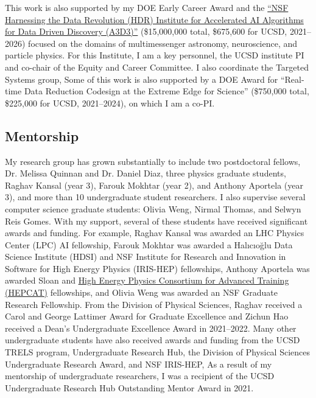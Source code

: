 \documentclass[11pt,letterpaper,notitlepage]{article}
\begin{document}
This work is also supported by my DOE Early Career Award and the \href{https://a3d3.ai}{``NSF Harnessing the Data Revolution (HDR) Institute for Accelerated AI Algorithms for Data Driven Discovery (A3D3)''} (\$15,000,000 total, \$675,600 for UCSD, 2021--2026) focused on the domains of multimessenger astronomy, neuroscience, and particle physics.
For this Institute, I am a key personnel, the UCSD institute PI and co-chair of the Equity and Career Committee.
I also coordinate the Targeted Systems group,
Some of this work is also supported by a DOE Award for ``Real-time Data Reduction Codesign at the Extreme Edge for Science'' (\$750,000 total, \$225,000 for UCSD, 2021--2024), on which I am a co-PI.
\vspace{-1ex}
\subsection*{Mentorship}

My research group has grown substantially to include two postdoctoral fellows, Dr. Melissa Quinnan and Dr. Daniel Diaz, three physics graduate students, Raghav Kansal (year 3), Farouk Mokhtar (year 2), and Anthony Aportela (year 3), and more than 10 undergraduate student researchers.
I also supervise several computer science graduate students: Olivia Weng, Nirmal Thomas, and Selwyn Reis Gomes.
With my support, several of these students have received significant awards and funding.
For example, Raghav Kansal was awarded an LHC Physics Center (LPC) AI fellowship, Farouk Mokhtar was awarded a Hal{\i}c{\i}o\u{g}lu Data Science Institute (HDSI) and NSF Institute for Research and Innovation in Software for High Energy Physics (IRIS-HEP) fellowships, Anthony Aportela was awarded Sloan and \href{https://hepcat.ucsd.edu}{High Energy Physics Consortium for Advanced Training (HEPCAT)} fellowships, and Olivia Weng was awarded an NSF Graduate Research Fellowship.
From the Division of Physical Sciences, Raghav received a Carol and George Lattimer Award for Graduate Excellence and Zichun Hao received a Dean's Undergraduate Excellence Award in 2021--2022.
Many other undergraduate students have also received awards and funding from the UCSD TRELS program, Undergraduate Research Hub, the Division of Physical Sciences Undergraduate Research Award, and NSF IRIS-HEP,
As a result of my mentorship of undergraduate researchers, I was a recipient of the UCSD Undergraduate Research Hub Outstanding Mentor Award in 2021.
\end{document}

